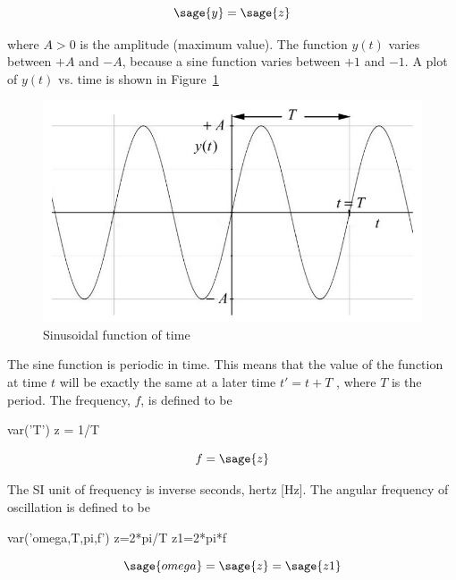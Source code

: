 \begin{equation}
\sage{y} = \sage{z}
\end{equation}

where $A > 0$ is the amplitude (maximum value). The function $y(t)$ varies 
between $+A$ and $-A$, because a sine function varies between $+1$ and $-1$. A 
plot of $y(t)$ vs. time is shown in 
Figure~\ref{fig:Sinusoidal function of time}

\begin{figure}
\begin{center}
        \includegraphics[scale=0.4]{graph.png}
\end{center}
        \caption{Sinusoidal function of time}
	\label{fig:Sinusoidal function of time}
\end{figure}

The sine function is periodic in time. This means that the value of the 
function at time $t$ will be exactly the same at a later time $t′ = t + T$ , 
where $T$ is the period. The frequency, $f$, is defined to be

\begin{sagesilent}
var('T')
z = 1/T
\end{sagesilent}

\begin{equation}
f = \sage{z}
\end{equation}

The SI unit of frequency is inverse seconds, hertz [Hz]. The angular frequency 
of oscillation is defined to be 

\begin{sagesilent}
var('omega,T,pi,f')
z=2*pi/T
z1=2*pi*f
\end{sagesilent}

\begin{equation}
\sage{omega} = \sage{z} = \sage{z1}
\end{equation}

